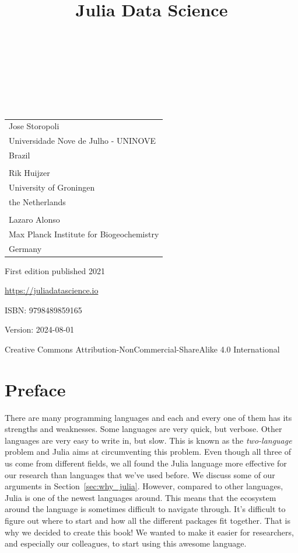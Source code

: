 \documentclass[
  notoc %
]{tufte-book}
\title{Julia Data Science}
\author{\noindent{Jose Storopoli}\\[3mm] \noindent{Rik
Huijzer}\\[3mm] \noindent{Lazaro Alonso}\\[3mm] }
\date{}
\begin{document}
\makeatletter
\thispagestyle{empty}
\vfill
{\Huge\bf
\noindent
\@title
}\\[1in]
{\Large
\noindent
\@author
}
\makeatother

\makeatletter
\newpage
\thispagestyle{empty}
\vfill
{\noindent
\begin{tabular}{l} Jose Storopoli\\ Universidade Nove de Julho - UNINOVE\\ Brazil\\ \\ Rik Huijzer\\ University of Groningen\\ the Netherlands\\ \\ Lazaro Alonso\\ Max Planck Institute for Biogeochemistry\\ Germany \end{tabular}
}
\vfill
{\small
First edition published 2021

\url{https://juliadatascience.io}

ISBN: 9798489859165

Version: 2024-08-01

Creative Commons Attribution-NonCommercial-ShareAlike 4.0 International
}
\makeatother


\frontmatter
\mainmatter

\setcounter{tocdepth}{1}
\tableofcontents

\justifying

\setlength{\parindent}{0pt}

\hypertarget{sec:preface}{%
\chapter{Preface}\label{sec:preface}}

There are many programming languages and each and every one of them has
its strengths and weaknesses. Some languages are very quick, but
verbose. Other languages are very easy to write in, but slow. This is
known as the \emph{two-language} problem and Julia aims at circumventing
this problem. Even though all three of us come from different fields, we
all found the Julia language more effective for our research than
languages that we've used before. We discuss some of our arguments in
Section~\ref{sec:why_julia}. However, compared to other languages, Julia
is one of the newest languages around. This means that the ecosystem
around the language is sometimes difficult to navigate through. It's
difficult to figure out where to start and how all the different
packages fit together. That is why we decided to create this book! We
wanted to make it easier for researchers, and especially our colleagues,
to start using this awesome language.
\end{document}

